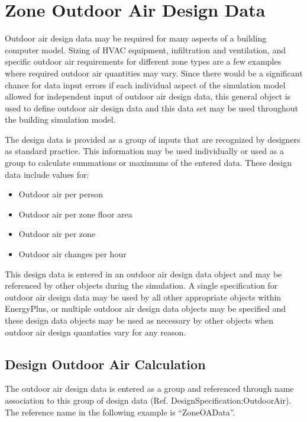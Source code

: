 \section{Zone Outdoor Air Design Data}\label{zone-outdoor-air-design-data}

Outdoor air design data may be required for many aspects of a building computer model. Sizing of HVAC equipment, infiltration and ventilation, and specific outdoor air requirements for different zone types are a few examples where required outdoor air quantities may vary. Since there would be a significant chance for data input errors if each individual aspect of the simulation model allowed for independent input of outdoor air design data, this general object is used to define outdoor air design data and this data set may be used throughout the building simulation model.

The design data is provided as a group of inputs that are recognized by designers as standard practice. This information may be used individually or used as a group to calculate summations or maximums of the entered data. These design data include values for:

\begin{itemize}
\tightlist
\item
  Outdoor air per person
\item
  Outdoor air per zone floor area
\item
  Outdoor air per zone
\item
  Outdoor air changes per hour
\end{itemize}

This design data is entered in an outdoor air design data object and may be referenced by other objects during the simulation. A single specification for outdoor air design data may be used by all other appropriate objects within EnergyPlus, or multiple outdoor air design data objects may be specified and these design data objects may be used as necessary by other objects when outdoor air design quantaties vary for any reason.

\subsection{Design Outdoor Air Calculation}\label{design-outdoor-air-calculation}

The outdoor air design data is entered as a group and referenced through name association to this group of design data (Ref. DesignSpecification:OutdoorAir). The reference name in the following example is ``ZoneOAData''.

